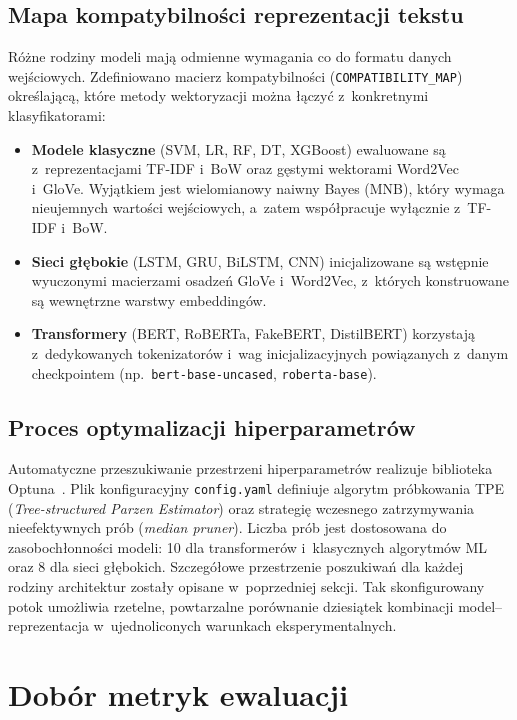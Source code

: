 \documentclass[oneside,polski,logo]{amuthesis}
\begin{document}
\subsection{Mapa kompatybilności reprezentacji tekstu}
Różne rodziny modeli mają odmienne wymagania co do formatu danych wejściowych. Zdefiniowano macierz kompatybilności (\texttt{COMPATIBILITY\_MAP}) określającą, które metody wektoryzacji można łączyć z~konkretnymi klasyfikatorami:
\begin{itemize}
    \item \textbf{Modele klasyczne} (SVM, LR, RF, DT, XGBoost) ewaluowane są z~reprezentacjami TF-IDF i~BoW oraz gęstymi wektorami Word2Vec i~GloVe. Wyjątkiem jest wielomianowy naiwny Bayes (MNB), który wymaga nieujemnych wartości wejściowych, a~zatem współpracuje wyłącznie z~TF-IDF i~BoW.
    \item \textbf{Sieci głębokie} (LSTM, GRU, BiLSTM, CNN) inicjalizowane są wstępnie wyuczonymi macierzami osadzeń GloVe i~Word2Vec, z~których konstruowane są wewnętrzne warstwy embeddingów.
    \item \textbf{Transformery} (BERT, RoBERTa, FakeBERT, DistilBERT) korzystają z~dedykowanych tokenizatorów i~wag inicjalizacyjnych powiązanych z~danym checkpointem (np.\ \texttt{bert-base-uncased}, \texttt{roberta-base}).
\end{itemize}

\subsection{Proces optymalizacji hiperparametrów}
Automatyczne przeszukiwanie przestrzeni hiperparametrów realizuje biblioteka Optuna~\cite{akiba2019optuna}. Plik konfiguracyjny \texttt{config.yaml} definiuje algorytm próbkowania TPE (\textit{Tree-structured Parzen Estimator}) oraz strategię wczesnego zatrzymywania nieefektywnych prób (\textit{median pruner}). Liczba prób jest dostosowana do zasobochłonności modeli: 10 dla transformerów i~klasycznych algorytmów ML oraz 8 dla sieci głębokich. Szczegółowe przestrzenie poszukiwań dla każdej rodziny architektur zostały opisane w~poprzedniej sekcji. Tak skonfigurowany potok umożliwia rzetelne, powtarzalne porównanie dziesiątek kombinacji model--reprezentacja w~ujednoliconych warunkach eksperymentalnych.

\section{Dobór metryk ewaluacji}
\end{document}
